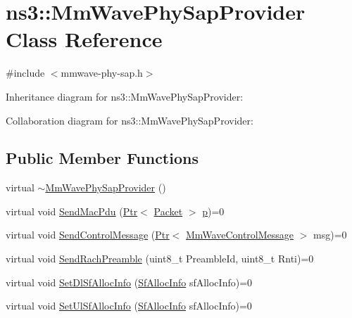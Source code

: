 \hypertarget{classns3_1_1MmWavePhySapProvider}{}\section{ns3\+:\+:Mm\+Wave\+Phy\+Sap\+Provider Class Reference}
\label{classns3_1_1MmWavePhySapProvider}


{\ttfamily \#include $<$mmwave-\/phy-\/sap.\+h$>$}



Inheritance diagram for ns3\+:\+:Mm\+Wave\+Phy\+Sap\+Provider\+:


Collaboration diagram for ns3\+:\+:Mm\+Wave\+Phy\+Sap\+Provider\+:
\subsection*{Public Member Functions}
\begin{DoxyCompactItemize}
\item 
virtual \hyperlink{classns3_1_1MmWavePhySapProvider_a6045501fb4fb7a31589d76df065b23a6}{$\sim$\+Mm\+Wave\+Phy\+Sap\+Provider} ()
\item 
virtual void \hyperlink{classns3_1_1MmWavePhySapProvider_ae7f41f77600402396e041eded35999fb}{Send\+Mac\+Pdu} (\hyperlink{classns3_1_1Ptr}{Ptr}$<$ \hyperlink{classns3_1_1Packet}{Packet} $>$ \hyperlink{lte__link__budget__x2__handover__measures_8m_ac9de518908a968428863f829398a4e62}{p})=0
\item 
virtual void \hyperlink{classns3_1_1MmWavePhySapProvider_a976b307eb8571c45503e119cefd512cc}{Send\+Control\+Message} (\hyperlink{classns3_1_1Ptr}{Ptr}$<$ \hyperlink{classns3_1_1MmWaveControlMessage}{Mm\+Wave\+Control\+Message} $>$ msg)=0
\item 
virtual void \hyperlink{classns3_1_1MmWavePhySapProvider_acfc3920ee6fc14a404ad9fb1412cbcb2}{Send\+Rach\+Preamble} (uint8\+\_\+t Preamble\+Id, uint8\+\_\+t Rnti)=0
\item 
virtual void \hyperlink{classns3_1_1MmWavePhySapProvider_a73dc14a264cf1972e2047d85f7ce3771}{Set\+Dl\+Sf\+Alloc\+Info} (\hyperlink{structns3_1_1SfAllocInfo}{Sf\+Alloc\+Info} sf\+Alloc\+Info)=0
\item 
virtual void \hyperlink{classns3_1_1MmWavePhySapProvider_aec21a7bf79514632d3b89a92d9d11629}{Set\+Ul\+Sf\+Alloc\+Info} (\hyperlink{structns3_1_1SfAllocInfo}{Sf\+Alloc\+Info} sf\+Alloc\+Info)=0
\end{DoxyCompactItemize}



